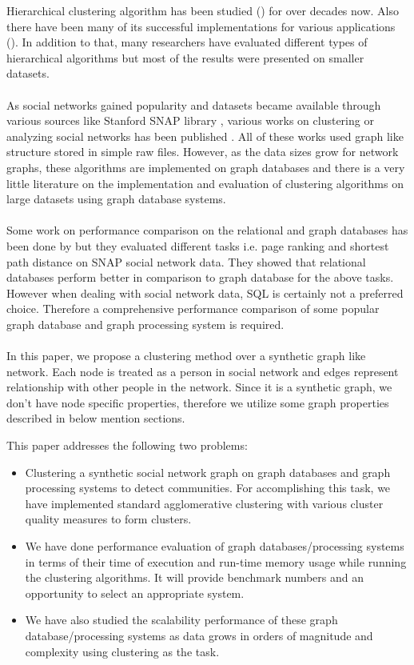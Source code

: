 \documentclass[11pt,onecolumn]{article}
\begin{document}
Hierarchical clustering algorithm has been studied (\cite{WillHerb}\cite{Chris}\cite{CFO}) for over decades now. Also there have been many of its successful implementations for various applications (\cite{SteinKar}\cite{ZhaoKar}). In addition to that, many researchers have evaluated different types of hierarchical algorithms but most of the results were presented on smaller datasets. 
\\\\
As social networks gained popularity and datasets became available through various sources like Stanford SNAP library \cite{snap}, various works on clustering or analyzing social networks has been published \cite{MishraSchrei}\cite{Held}. All of these works used graph like structure stored in simple raw files. However, as the data sizes grow for network graphs, these algorithms are implemented on graph databases and there is a very little literature \cite{GuhaRat} on the implementation and evaluation of clustering algorithms on large datasets using graph database systems.
\\\\
Some work on performance comparison on the relational and graph databases has been done by \cite{benchmark} but they evaluated different tasks i.e. page ranking and shortest path distance on SNAP social network data. They showed that relational databases perform better in comparison to graph database for the above tasks. However when dealing with social network data, SQL is certainly not a preferred choice. Therefore a comprehensive performance comparison of some popular graph database and graph processing system is required.
\\\\
In this paper, we propose a clustering method over a synthetic graph like network. Each node is treated as a person in social network and edges represent relationship with other people in the network. Since it is a synthetic graph, we don’t have node specific properties, therefore we utilize some graph properties described in below mention sections.

This paper addresses the following two problems:
\begin{itemize}
\item
Clustering a synthetic social network graph on graph databases and graph processing systems to detect communities. For accomplishing this task, we have implemented standard agglomerative clustering with various cluster quality measures to form clusters.
\item
We have done performance evaluation of graph databases/processing systems in terms of their time of execution and run-time memory usage while running the clustering algorithms. It will provide benchmark numbers and an opportunity to select an appropriate system.
\item
We have also studied the scalability performance of these graph database/processing systems as data grows in orders of magnitude and complexity using clustering as the task.
\end{itemize}
\end{document}
